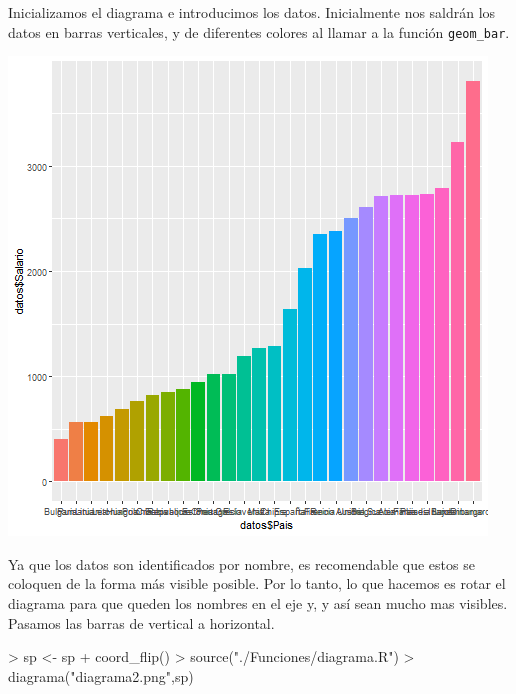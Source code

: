 \documentclass [a4paper] {article}
\begin{document}
\bigskip
Inicializamos el diagrama e introducimos los datos. Inicialmente nos saldrán los datos en barras verticales, y
de diferentes colores al llamar a la función \texttt{geom\_bar}.
\begin{Schunk}
\end{Schunk}

\includegraphics[width=\textwidth]{diagrama1}

\bigskip
Ya que los datos son identificados por nombre, es recomendable que estos se coloquen de la forma más visible
posible. Por lo tanto, lo que hacemos es rotar el diagrama para que queden los nombres en el eje y, y así
sean mucho mas visibles. Pasamos las barras de vertical a horizontal.
\begin{Schunk}
\begin{Sinput}
> sp <- sp + coord_flip()
> source("./Funciones/diagrama.R")
> diagrama("diagrama2.png",sp)
\end{Sinput}
\end{Schunk}
\end{document}

